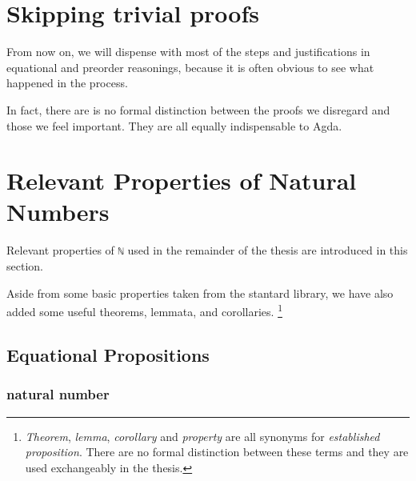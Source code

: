 \documentclass[../thesis.tex]{subfiles}
\begin{document}


%
%

\section{Skipping trivial proofs}

From now on, we will dispense with most of the steps and justifications in
equational and preorder reasonings,
because it is often obvious to see what happened in the process.

In fact, there are is no formal distinction between the proofs we disregard and
those we feel important. They are all equally indispensable to Agda.

\section{Relevant Properties of Natural Numbers}

Relevant properties of {\lstinline|ℕ|} used in the remainder of the thesis
are introduced in this section.

Aside from some basic properties taken from the stantard library, we have
also added some useful theorems, lemmata, and corollaries.
\footnote{\textit{Theorem}, \textit{lemma}, \textit{corollary} and \textit{property}
are all synonyms for \textit{established proposition}. There are no formal
distinction between these terms and they are used exchangeably in the thesis.}

\subsection{Equational Propositions}

\subsubsection{natural number}
\end{document}
